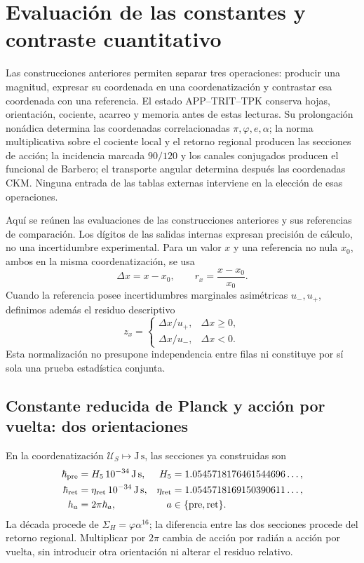 \section{Evaluación de las constantes y contraste cuantitativo}
\label{sec:ii-contraste-cuantitativo}

Las construcciones anteriores permiten separar tres operaciones:
producir una magnitud, expresar su coordenada en una coordenatización y contrastar esa
coordenada con una referencia. El estado APP--TRIT--TPK conserva hojas,
orientación, cociente, acarreo y memoria antes de estas lecturas. Su
prolongación nonádica determina las coordenadas correlacionadas
\(\pi,\varphi,e,\alpha\); la norma multiplicativa sobre el cociente local y el retorno regional
producen las secciones de acción; la incidencia marcada \(90/120\) y
los canales conjugados producen el funcional de Barbero; el transporte
angular determina después las coordenadas CKM. Ninguna entrada de las tablas
externas interviene en la elección de esas operaciones.

Aquí se reúnen las evaluaciones de las construcciones anteriores y sus
referencias de comparación. Los dígitos de las salidas internas expresan
precisión de cálculo, no una incertidumbre experimental. Para un valor
\(x\) y una referencia no nula \(x_0\), ambos en la misma coordenatización, se usa
\[
 \Delta x=x-x_0,\qquad r_x=\frac{x-x_0}{x_0}.
\]
Cuando la referencia posee incertidumbres marginales asimétricas
\(u_-,u_+\), definimos además el residuo descriptivo
\begin{equation}
 z_x=\begin{cases}
 \Delta x/u_+,&\Delta x\geq0,\\
 \Delta x/u_-,&\Delta x<0.
 \end{cases}
 \label{eq:ii-residuo-marginal}
\end{equation}
Esta normalización no presupone independencia entre filas ni constituye
por sí sola una prueba estadística conjunta.

\subsection{Constante reducida de Planck y acción por vuelta: dos orientaciones}

En la coordenatización \(\mathcal U_S\mapsto\mathrm{J\,s}\), las secciones ya
construidas son
\begin{align}
 \hbar_{\rm pre}&=H_5\,10^{-34}\,\mathrm{J\,s},&
 H_5&=1.0545718176461544696\ldots,\\
 \hbar_{\rm ret}&=\eta_{\rm ret}\,10^{-34}\,\mathrm{J\,s},&
 \eta_{\rm ret}&=1.0545718169150390611\ldots,\\
 h_a&=2\pi\hbar_a,&a&\in\{\mathrm{pre},\mathrm{ret}\}.
 \label{eq:ii-cuatro-coordenadas-planck}
\end{align}
La década procede de \(\Sigma_H=\varphi\alpha^{16}\); la diferencia entre
las dos secciones procede del retorno regional. Multiplicar por \(2\pi\)
cambia de acción por radián a acción por vuelta, sin introducir otra
orientación ni alterar el residuo relativo.

